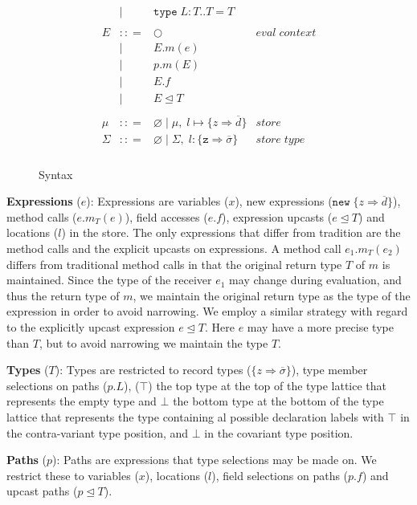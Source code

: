 \documentclass{llncs}
\numberwithin{subcase}{casethm}
\numberwithin{casethm}{theorem}
\numberwithin{casethm}{lemma}
\begin{document}
\begin{figure}[h]
\[\begin{array}{lll}
\begin{array}{lllr}
  & |   & \texttt{type} \; L : T .. T = T &\\
&&\\
E & :: = & \bigcirc & eval \; context\\
       & | & E.m(e)\\
       & | & p.m(E)\\
       & | & E.f\\
       & | & E \unlhd T\\
&&\\
\mu & :: = & \varnothing \; | \; \mu,\; l \mapsto \{z \Rightarrow \overline{d}\} & store \\
\Sigma & :: = & \varnothing \; | \; \Sigma,\; l : \{\texttt{z} \Rightarrow \overline{\sigma}\} & store \; type \\
\end{array}
\end{array}
\]
\caption{Syntax}
\label{f:syntax}
\end{figure}

\textbf{Expressions} ($e$): Expressions are variables ($x$), new 
expressions ($\texttt{new} \; \{z \Rightarrow \overline{d}\}$), 
method calls ($e.m_T(e)$), field accesses ($e.f$), expression 
upcasts ($e \unlhd T$) and locations ($l$) in the store. The 
only expressions that differ from tradition are the method 
calls and the explicit upcasts on expressions. A method call 
$e_1.m_T(e_2)$ differs from traditional method calls in that 
the original return type $T$ of $m$ is maintained. Since the 
type of the receiver $e_1$ may change during evaluation, and 
thus the return type of $m$, we maintain the original return 
type as the type of the expression in order to avoid narrowing. 
We employ a similar strategy with regard to the explicitly 
upcast expression $e \unlhd T$. Here $e$ may have a more precise 
type than $T$, but to avoid narrowing we maintain the type $T$.

\textbf{Types} ($T$): Types are restricted to record types 
($\{z \Rightarrow \overline{\sigma}\}$), type member selections on 
paths ($p.L$), ($\top$) the top type at the top of the type lattice 
that represents the empty type and $\bot$ the bottom type at the 
bottom of the type lattice that represents the type containing 
al possible declaration labels with $\top$ in the contra-variant 
type position, and $\bot$ in the covariant type position.

\textbf{Paths} ($p$): Paths are expressions that type selections may be 
made on. We restrict these to variables ($x$), locations ($l$), 
field selections on paths ($p.f$) and upcast paths ($p \unlhd T$).
\end{document}
